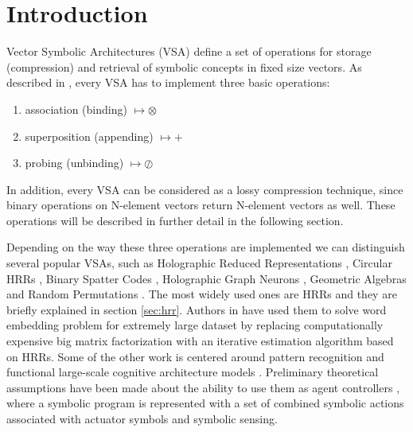\documentclass[journal]{journal}
\begin{document}
	\section{Introduction}
	
	Vector Symbolic Architectures (VSA) define a set of operations for storage (compression) and retrieval of symbolic concepts in fixed size vectors.
As described in \cite{Levy:2008:VectorSymbolicArchitectures}, every VSA has to implement three basic operations:
	\begin{enumerate}
		\item association (binding) $\mapsto \otimes$
		\item superposition (appending) $\mapsto +$
		\item probing (unbinding) $\mapsto \oslash$
	\end{enumerate}
	
	In addition, every VSA can be considered as a lossy compression technique, since binary operations on N-element vectors return N-element vectors as well. These operations will be described in further detail in the following section. 
	
	Depending on the way these three operations are implemented we can distinguish several popular VSAs, such as Holographic Reduced Representations \cite{Plate:1995:HolographicReducedRepresentations}, Circular HRRs \cite{DeVine:2010:Semanticoscillations}, Binary Spatter Codes \cite{Kanerva:1994:SpatterCodeEncoding}, Holographic Graph Neurons \cite{Kleyko:2016:HolographicGraphNeuron}, Geometric Algebras \cite{Patyk-Lonska:2011:DistributedRepresentationsBased} and Random Permutations \cite{Recchia:2015:EncodingSequentialInformation}.
The most widely used ones are HRRs and they are briefly explained in section \ref{sec:hrr}.
Authors in \cite{Golosio:2015:CognitiveNeuralArchitecture} have used them to solve word embedding problem for extremely large dataset by replacing computationally expensive big matrix factorization with an iterative estimation algorithm based on HRRs.
Some of the other work is centered around pattern recognition \cite{Kleyko:2016:PatternRecognitionVector} and functional large-scale cognitive architecture models \cite{Eliasmith:2012:LargeScaleModel}.
Preliminary theoretical assumptions have been made about the ability to use them as agent controllers \cite{Levy:2013:LearningBehaviorHierarchies}, where a symbolic program is represented with a set of combined symbolic actions associated with actuator symbols and symbolic sensing.
	
\end{document}
